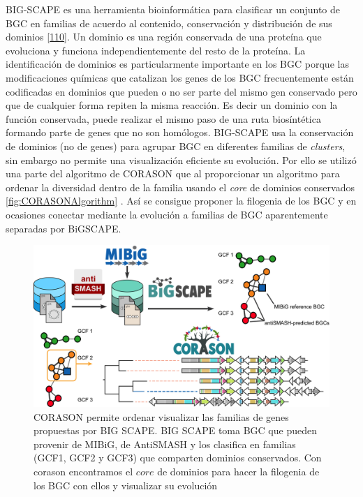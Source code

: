 \documentclass[12pt,twoside]{reedthesis}
\begin{document}
  BIG-SCAPE es una herramienta bioinformática para clasificar un conjunto
  de BGC en familias de acuerdo al contenido, conservación y distribución
  de sus dominios
  {[}\protect\hyperlink{ref-navarro-munoz_computational_2018}{110}{]}. Un
  dominio es una región conservada de una proteína que evoluciona y
  funciona independientemente del resto de la proteína. La identificación
  de dominios es particularmente importante en los BGC porque las
  modificaciones químicas que catalizan los genes de los BGC
  frecuentemente están codificadas en dominios que pueden o no ser parte
  del mismo gen conservado pero que de cualquier forma repiten la misma
  reacción. Es decir un dominio con la función conservada, puede realizar
  el mismo paso de una ruta biosíntética formando parte de genes que no
  son homólogos. BIG-SCAPE usa la conservación de dominios (no de genes)
  para agrupar BGC en diferentes familias de \emph{clusters}, sin embargo
  no permite una visualización eficiente su evolución. Por ello se utilizó
  una parte del algoritmo de CORASON que al proporcionar un algoritmo para
  ordenar la diversidad dentro de la familia usando el \emph{core} de
  dominios conservados \autoref{fig:CORASONAlgorithm} . Así se consigue
  proponer la filogenia de los BGC y en ocasiones conectar mediante la
  evolución a familias de BGC aparentemente separadas por BiGSCAPE.
  
  \begin{figure}[h!tbp]
  \centering
  \includegraphics[angle = 0,scale = .3]{chapter3/corason_fig1.png}
  \caption[Algoritmo de CORASON Algorithm]{\footnotesize{CORASON permite ordenar visualizar las familias de genes propuestas por BIG SCAPE. BIG SCAPE toma BGC que pueden provenir de MIBiG, de AntiSMASH y los clasifica en familias (GCF1, GCF2 y GCF3) que comparten dominios conservados. Con corason encontramos el $core$ de dominios para hacer la filogenia de los BGC con ellos y visualizar su evolución }}
  \label{fig:CORASONAlgorithm}
  \end{figure}
  
\end{document}
